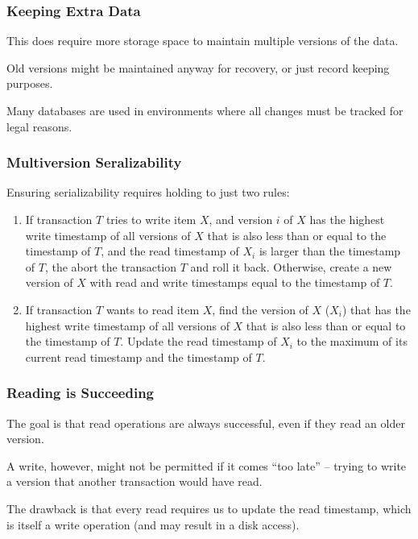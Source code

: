 \begin{frame}
\frametitle{Keeping Extra Data}
This does require more storage space to maintain multiple versions of the data. 

Old versions might be maintained anyway for recovery, or just record keeping purposes.

Many databases are used in environments where all changes must be tracked for legal reasons.

\end{frame}


\begin{frame}
\frametitle{Multiversion Seralizability}


Ensuring serializability requires holding to just two rules:

\begin{enumerate}
	\item If transaction $T$ tries to write item $X$, and version $i$ of $X$ has the highest write timestamp of all versions of $X$ that is also less than or equal to the timestamp of $T$, and the read timestamp of $X_{i}$ is larger than the timestamp of $T$, the abort the transaction $T$ and roll it back. Otherwise, create a new version of $X$ with read and write timestamps equal to the timestamp of $T$.
	
	\item If transaction $T$ wants to read item $X$, find the version of $X$ ($X_{i}$) that has the highest write timestamp of all versions of $X$ that is also less than or equal to the timestamp of $T$. Update the read timestamp of $X_{i}$ to the maximum of its current read timestamp and the timestamp of $T$.
\end{enumerate}


\end{frame}

\begin{frame}
\frametitle{Reading is Succeeding}
The goal is that read operations are always successful, even if they read an older version. 

A write, however, might not be permitted if it comes ``too late'' -- trying to write a version that another transaction would have read. 

The drawback is that every read requires us to update the read timestamp, which is itself a write operation (and may result in a disk access).

\end{frame}

